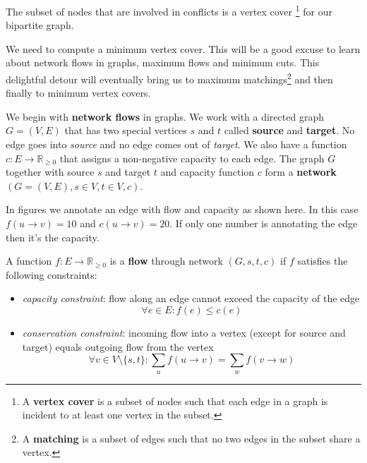 The subset of nodes that are involved in conflicts is a vertex cover \footnote{A \textbf{vertex cover} is a subset of nodes such that each edge in a graph is incident to at least one vertex in the subset.} for our bipartite graph.

We need to compute a minimum vertex cover. This will be a good excuse to learn about network flows in graphs, maximum flows and minimum cuts. This delightful detour will eventually bring us to maximum matchings\footnote{A \textbf{matching} is a subset of edges such that no two edges in the subset share a vertex.} and then finally to minimum vertex covers.\newline


We begin with \textbf{network flows} in graphs. We work with a directed graph $G=(V, E)$ that has two special vertices $s$ and $t$ called \textbf{source} and \textbf{target}.  No edge goes into \emph{source} and no edge comes out of \emph{target}. We also have a function $c:E \to \mathbb{R}_{\geq 0}$ that assigns a non-negative capacity to each edge. The graph $G$ together with source $s$ and target $t$ and capacity function $c$ form a \textbf{network} $(G=(V, E), s \in V, t \in V, c)$.

\begin{marginfigure}
    \caption{In figures we annotate an edge with flow and capacity as shown here. In this case $f(u \rightarrow v) = 10$ and $c(u \rightarrow v) = 20$. If only one number is annotating the edge then it's the capacity.}
	\label{edge_flow_cap}
\end{marginfigure}

\begin{defn}\label{stflow}
A function $f:E \to \mathbb{R}_{\geq 0}$ is a \textbf{flow} through network $(G, s, t, c)$ if $f$ satisfies the following constraints: 

\begin{itemize}
  \item \emph{capacity constraint}: flow along an edge cannot exceed the capacity of the edge
  $$
  \forall e \in E: f(e) \leq c(e)
  $$
  \item \emph{conservation constraint}: incoming flow into a vertex (except for source and target) equals outgoing flow from the vertex
  $$
  \forall v \in V \setminus \{s,t\}: \sum_u f(u \rightarrow v) = \sum_w f(v \rightarrow w)
  $$
\end{itemize}
\end{defn}

